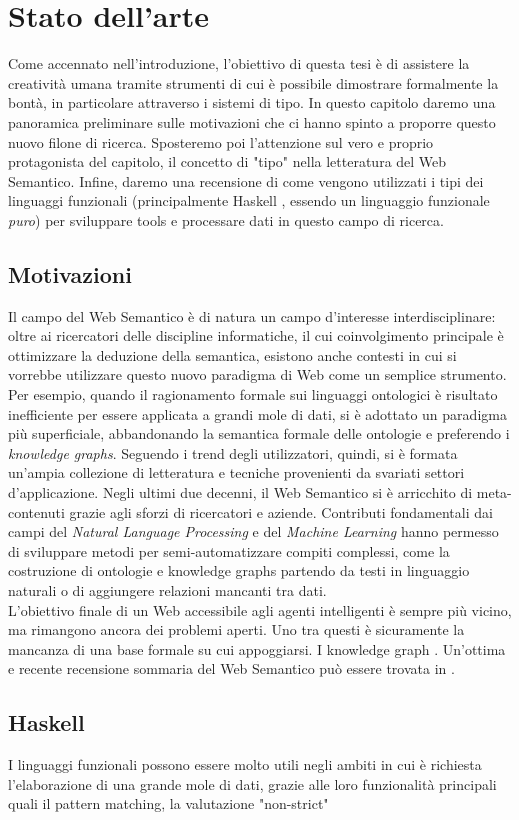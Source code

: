 \chapter[Stato dell'arte]{Stato dell'arte}
Come accennato nell'introduzione, l'obiettivo di questa tesi è di assistere la creatività umana tramite strumenti di cui è possibile dimostrare formalmente la bontà, in particolare attraverso i sistemi di tipo. In questo capitolo daremo una panoramica preliminare sulle motivazioni che ci hanno spinto a proporre questo nuovo filone di ricerca. Sposteremo poi l'attenzione sul vero e proprio protagonista del capitolo, il concetto di "tipo" nella letteratura del Web Semantico. Infine, daremo una recensione di come vengono utilizzati i tipi dei linguaggi funzionali (principalmente Haskell \cite{o2008real}, essendo un linguaggio funzionale \textit{puro}) per sviluppare tools e processare dati in questo campo di ricerca.

\section*{Motivazioni}
Il campo del Web Semantico è di natura un campo d'interesse interdisciplinare: oltre ai ricercatori delle discipline informatiche, il cui coinvolgimento principale è ottimizzare la deduzione della semantica, esistono anche contesti in cui si vorrebbe utilizzare questo nuovo paradigma di Web come un semplice strumento. Per esempio, quando il ragionamento formale sui linguaggi ontologici è risultato inefficiente per essere applicata a grandi mole di dati, si è adottato un paradigma più superficiale, abbandonando la semantica formale delle ontologie e preferendo i \textit{knowledge graphs}. Seguendo i trend degli utilizzatori, quindi, si è formata un'ampia collezione di letteratura e tecniche provenienti da svariati settori d'applicazione. Negli ultimi due decenni, il Web Semantico si è arricchito di meta-contenuti grazie agli sforzi di ricercatori e aziende. Contributi fondamentali dai campi del \textit{Natural Language Processing} e del \emph{Machine Learning} hanno permesso di sviluppare metodi per semi-automatizzare compiti complessi, come la costruzione di ontologie e knowledge graphs partendo da testi in linguaggio naturali o di aggiungere relazioni mancanti tra dati.\\
L'obiettivo finale di un Web accessibile agli agenti intelligenti è sempre più vicino, ma rimangono ancora dei problemi aperti. Uno tra questi è sicuramente la mancanza di una base formale su cui appoggiarsi. I knowledge graph  \cite{ehrlinger2016towards}. Un'ottima e recente recensione sommaria del Web Semantico può essere trovata in \cite{hitzler2021review}.

\section{Haskell}
I linguaggi funzionali possono essere molto utili negli ambiti in cui è richiesta l'elaborazione di una grande mole di dati, grazie alle loro funzionalità principali quali il pattern matching, la valutazione "non-strict"